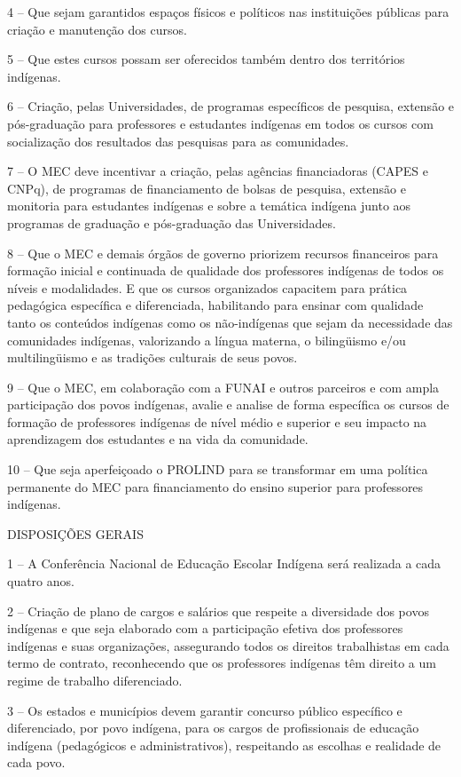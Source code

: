 \documentclass[
]{book}
\begin{document}
4 -- Que sejam garantidos espaços físicos e políticos nas instituições públicas para criação e manutenção dos cursos.

5 -- Que estes cursos possam ser oferecidos também dentro dos territórios indígenas.

6 -- Criação, pelas Universidades, de programas específicos de pesquisa, extensão e pós-graduação para professores e estudantes indígenas em todos os cursos com socialização dos resultados das pesquisas para as comunidades.

7 -- O MEC deve incentivar a criação, pelas agências financiadoras (CAPES e CNPq), de programas de financiamento de bolsas de pesquisa, extensão e monitoria para estudantes indígenas e sobre a temática indígena junto aos programas de graduação e pós-graduação das Universidades.

8 -- Que o MEC e demais órgãos de governo priorizem recursos financeiros para formação inicial e continuada de qualidade dos professores indígenas de todos os níveis e modalidades. E que os cursos organizados capacitem para prática pedagógica específica e diferenciada, habilitando para ensinar com qualidade tanto os conteúdos indígenas como os não-indígenas que sejam da necessidade das comunidades indígenas, valorizando a língua materna, o bilingüismo e/ou multilingüismo e as tradições culturais de seus povos.

9 -- Que o MEC, em colaboração com a FUNAI e outros parceiros e com ampla participação dos povos indígenas, avalie e analise de forma específica os cursos de formação de professores indígenas de nível médio e superior e seu impacto na aprendizagem dos estudantes e na vida da comunidade.

10 -- Que seja aperfeiçoado o PROLIND para se transformar em uma política permanente do MEC para financiamento do ensino superior para professores indígenas.

DISPOSIÇÕES GERAIS

1 -- A Conferência Nacional de Educação Escolar Indígena será realizada a cada quatro anos.

2 -- Criação de plano de cargos e salários que respeite a diversidade dos povos indígenas e que seja elaborado com a participação efetiva dos professores indígenas e suas organizações, assegurando todos os direitos trabalhistas em cada termo de contrato, reconhecendo que os professores indígenas têm direito a um regime de trabalho diferenciado.

3 -- Os estados e municípios devem garantir concurso público específico e diferenciado, por povo indígena, para os cargos de profissionais de educação indígena (pedagógicos e administrativos), respeitando as escolhas e realidade de cada povo.
\end{document}
